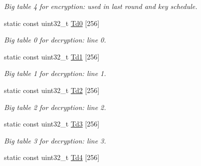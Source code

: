 \begin{DoxyCompactItemize}
\begin{DoxyCompactList}\small\item\em Big table 4 for encryption\+: used in last round and key schedule. \end{DoxyCompactList}\item 
\hypertarget{classAES_a7bbd2172252303a948bec8475508429b}{}static const uint32\+\_\+t \hyperlink{classAES_a7bbd2172252303a948bec8475508429b}{Td0} \mbox{[}256\mbox{]}\label{classAES_a7bbd2172252303a948bec8475508429b}

\begin{DoxyCompactList}\small\item\em Big table 0 for decryption\+: line 0. \end{DoxyCompactList}\item 
\hypertarget{classAES_a3d928eaf8c2226ef211de8bfed691631}{}static const uint32\+\_\+t \hyperlink{classAES_a3d928eaf8c2226ef211de8bfed691631}{Td1} \mbox{[}256\mbox{]}\label{classAES_a3d928eaf8c2226ef211de8bfed691631}

\begin{DoxyCompactList}\small\item\em Big table 1 for decryption\+: line 1. \end{DoxyCompactList}\item 
\hypertarget{classAES_afc8e7e7db9bafe812fa75558ab9f296f}{}static const uint32\+\_\+t \hyperlink{classAES_afc8e7e7db9bafe812fa75558ab9f296f}{Td2} \mbox{[}256\mbox{]}\label{classAES_afc8e7e7db9bafe812fa75558ab9f296f}

\begin{DoxyCompactList}\small\item\em Big table 2 for decryption\+: line 2. \end{DoxyCompactList}\item 
\hypertarget{classAES_a7817d74a93358cf50f9573e17774a4c5}{}static const uint32\+\_\+t \hyperlink{classAES_a7817d74a93358cf50f9573e17774a4c5}{Td3} \mbox{[}256\mbox{]}\label{classAES_a7817d74a93358cf50f9573e17774a4c5}

\begin{DoxyCompactList}\small\item\em Big table 3 for decryption\+: line 3. \end{DoxyCompactList}\item 
\hypertarget{classAES_a7204be29de9c0c6c77b2eac6fce04d36}{}static const uint32\+\_\+t \hyperlink{classAES_a7204be29de9c0c6c77b2eac6fce04d36}{Td4} \mbox{[}256\mbox{]}\label{classAES_a7204be29de9c0c6c77b2eac6fce04d36}


\end{DoxyCompactItemize}
